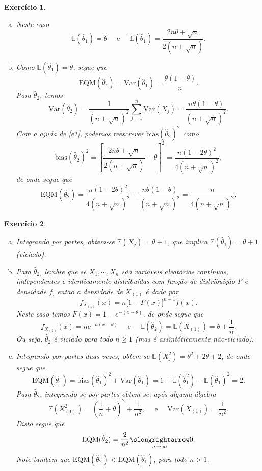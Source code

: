 \documentclass[letter,11pt]{article}
\newtheorem{exer}{Exercício}
\newcommand{\E}{\mathbb {E}}
\newcommand{\eqm}{\mbox{EQM}}
\newcommand{\var}{\mathrm{Var}}
\newcommand{\te}{\theta}
\renewcommand{\th}{\hat\theta}
\begin{document}

\begin{exer} \rm
\begin{enumerate}[a)]

\item Neste caso
\begin{equation}\label{e1}
\E(\hat\theta_1)=\te \quad \mbox{ e }\quad
\E(\hat\te_1)=\frac{2n\te+\sqrt n}{2(n+\sqrt n)}.
\end{equation}

\item Como $\E(\hat\te_1)=\te$, segue que
\[\eqm(\hat\te_1)=\var(\hat\te_1)=\frac{\te(1-\te)}{n}.\]
Para $\hat\te_2$, temos
\[\var(\hat\te_2)=\frac{1}{(n+\sqrt n )^2}\sum_{j=1}^n\var(X_j)=\frac{n\te(1-\te)}{(n+\sqrt n )^2}.\]
Com a ajuda de \eqref{e1}, podemos reescrever
$\mathrm{bias}(\th_2)^2$ como
\[\mathrm{bias}(\th_2)^2=\left[\frac{2n\te+\sqrt n}{2(n+\sqrt n)}-\te\right]^2=\frac{n(1-2\te)^2}{4(n+\sqrt n)^2},\]
de onde segue que
\[\eqm(\th_2)=\frac{n(1-2\te)^2}{4(n+\sqrt n)^2}+\frac{n\te(1-\te)}{(n+\sqrt n )^2}=\frac{n}{4(n+\sqrt n)^2}.\]
\end{enumerate}
\end{exer}


\begin{exer} \rm
\begin{enumerate}[a)]
\item Integrando por partes, obtem-se
$\E(X_j)=\te+1$, que implica $\E(\th_1)=\te+1$ (viciado). \item[]
Para $\th_2$, lembre que se $X_1,\cdots,X_n$ são variáveis
aleatórias contínuas, independentes e identicamente distribuídas
com função de distribuição $F$ e densidade $f$, então a densidade
de $X_{(1)}$ é dada por
    \[f_{X_{(1)}}(x)=n\big[1-F(x)\big]^{n-1}f(x).\]
    Neste caso temos $F(x)=1-e^{-(x-\te)}$, de onde segue que
    \[f_{X_{(1)}}(x)=ne^{-n(x-\te)}\quad\mbox{ e }\quad \E(\th_2)=\E(X_{(1)})=\te+\frac{1}{n}.\]
    Ou seja, $\th_2$ é viciado para todo $n\geq 1$ (mas é assintóticamente não-viciado).
\item Integrando por partes duas vezes, obtem-se
$\E(X_j^2)=\te^2+2\te+2$, de onde segue que
\[\eqm(\th_1)=\mathrm{bias}(\th_1)^2+\var(\th_1)=1+\E(\th_1^2)-\E(\th_1)^2=2.\]
Para $\th_2$, integrando-se por partes obtem-se, após alguma
álgebra
\[\E(X_{(1)}^2)=\left(\frac{1}{n}+\te\right)^2+\frac{1}{n^2},\quad\mbox{ e }\quad \var(X_{(1)})=\frac{1}{n^2}.\]
Disto segue que
\[\eqm(\th_2)=\frac{2}{n^2}\underset{n\rightarrow\infty}{\slongrightarrow}0.\]
Note também que $\eqm(\th_2)<\eqm(\th_1)$, para todo $n>1$.
\end{enumerate}
\end{exer}
\end{document}
